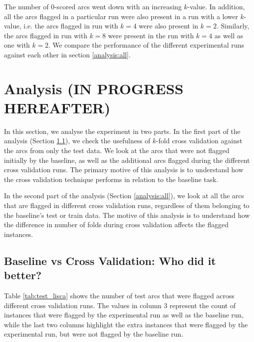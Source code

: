 The number of 0-scored arcs went down with an increasing \(k\)-value. In addition, all the arcs flagged in a particular run were also present in a run with a lower \(k\)-value, i.e. the arcs flagged in run with \(k=4\) were also present in \(k=2\). Similarly, the arcs flagged in run with \(k=8\) were present in the run with \(k=4\) as well as one with \(k=2\). We compare the performance of the different experimental runs against each other in section \ref{analysis:all}.

\section{Analysis (IN PROGRESS HEREAFTER)}
\label{compare:lisca}

In this section, we analyse the experiment in two parts. In the first part of the analysis (Section \ref{analysis:test}), we check the usefulness of \(k\)-fold cross validation against the arcs from only the test data. We look at the arcs that were not flagged initially by the baseline, as well as the additional arcs flagged during the different cross validation runs. The primary motive of this analysis is to understand how the cross validation technique performs in relation to the baseline task.

In the second part of the analysis (Section \ref{analysis:all}), we look at all the arcs that are flagged in different cross validation runs, regardless of them belonging to the baseline's test or train data. The motive of this analysis is to understand how the difference in number of folds during cross validation affects the flagged instances.

\subsection{Baseline vs Cross Validation: Who did it better?}
\label{analysis:test}

Table \ref{tab:test_lisca} shows the number of test arcs that were flagged across different cross validation runs. The values in column 3 represent the count of instances that were flagged by the experimental run as well as the baseline run, while the last two columns highlight the extra instances that were flagged by the experimental run, but were not flagged by the baseline run. 

